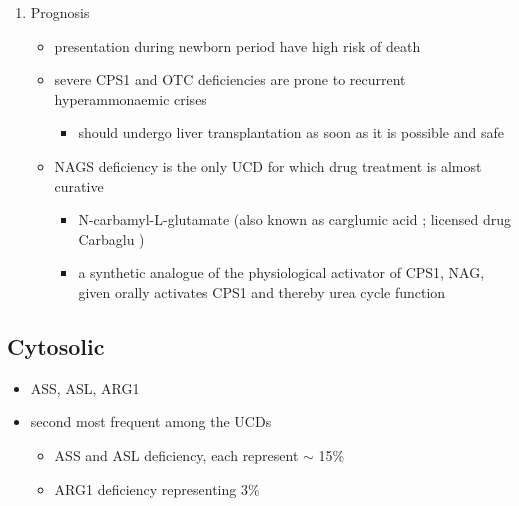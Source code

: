 \documentclass{scrartcl}
\begin{document}
\begin{enumerate}
\item Prognosis
\label{sec:org0193a17}
\begin{itemize}
\item presentation during newborn period have high risk of death
\item severe CPS1 and OTC deficiencies are prone to recurrent
hyperammonaemic crises
\begin{itemize}
\item should undergo liver transplantation as soon as it is possible and
safe
\end{itemize}
\item NAGS deficiency is the only UCD for which drug treatment is almost
curative
\begin{itemize}
\item N-carbamyl-L-glutamate (also known as carglumic acid ; licensed
drug Carbaglu )
\item a synthetic analogue of the physiological activator of CPS1, NAG,
given orally activates CPS1 and thereby urea cycle function
\end{itemize}
\end{itemize}
\end{enumerate}

\subsection{Cytosolic}
\label{sec:org7e28756}
\begin{itemize}
\item ASS, ASL, ARG1
\item second most frequent among the UCDs
\begin{itemize}
\item ASS and ASL deficiency, each represent \(\sim\) 15\%
\item ARG1 deficiency representing 3\%
\end{itemize}
\end{itemize}
\end{document}
